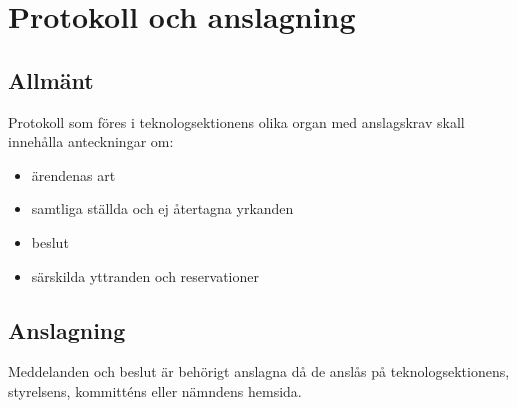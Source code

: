 \section{Protokoll och anslagning}

\subsection{Allmänt}
Protokoll som föres i teknologsektionens olika organ med anslagskrav skall innehålla anteckningar om:
\begin{itemize}
	\item ärendenas art
	\item samtliga ställda och ej återtagna yrkanden
	\item beslut
	\item särskilda yttranden och reservationer
\end{itemize}

\subsection{Anslagning}
\label{sec:protokoll:anslagning}
Meddelanden och beslut är behörigt anslagna då de anslås på teknologsektionens, styrelsens, kommitténs eller nämndens hemsida.